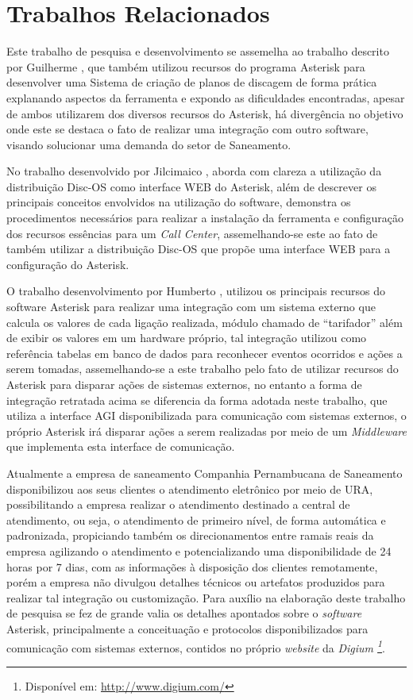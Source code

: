 \section*{Trabalhos Relacionados}
Este trabalho de pesquisa e desenvolvimento se assemelha ao trabalho descrito por Guilherme \cite{VIEIRA:2007}, que também utilizou recursos do programa Asterisk para desenvolver uma Sistema de criação de planos de discagem de forma prática explanando aspectos da ferramenta e expondo as dificuldades encontradas, apesar de ambos utilizarem dos diversos recursos do Asterisk, há divergência no objetivo onde este se destaca o fato de realizar uma integração com outro software, visando solucionar uma demanda do setor de Saneamento.

No trabalho desenvolvido por Jilcimaico \cite{DARU:2008}, aborda com clareza a utilização da distribuição Disc-OS como interface WEB do Asterisk, além de descrever os principais conceitos envolvidos na utilização do software, demonstra os procedimentos necessários para realizar a instalação da ferramenta e configuração dos recursos essências para um \textit{Call Center}, assemelhando-se este ao fato de também utilizar a distribuição Disc-OS que propõe uma interface WEB para a configuração do Asterisk.

O trabalho desenvolvimento por Humberto \cite{CAMPOS:2007}, utilizou os principais recursos do software Asterisk para realizar uma integração com um sistema externo que calcula os valores de cada ligação realizada, módulo chamado de “tarifador” além de exibir os valores em um hardware próprio, tal integração utilizou como referência tabelas em banco de dados para reconhecer eventos ocorridos e ações a serem tomadas, assemelhando-se a este trabalho pelo fato de utilizar recursos do Asterisk para disparar ações de sistemas externos, no entanto a forma de integração retratada acima se diferencia da forma adotada neste trabalho, que utiliza a interface AGI disponibilizada para comunicação com sistemas externos, o próprio Asterisk irá disparar ações a serem realizadas por meio de um \textit{Middleware} que implementa esta interface de comunicação.

Atualmente a empresa de saneamento Companhia Pernambucana de Saneamento \cite{COMPESA:URA} disponibilizou aos seus clientes o atendimento eletrônico por meio de URA, possibilitando a empresa realizar o atendimento destinado a central de atendimento, ou seja, o atendimento de primeiro nível, de forma automática e padronizada, propiciando também os direcionamentos entre ramais reais da empresa agilizando o atendimento e potencializando uma disponibilidade de 24 horas por 7 dias, com as informações à disposição dos clientes remotamente, porém a empresa não divulgou detalhes técnicos ou artefatos produzidos para realizar tal integração ou customização.
Para auxílio na elaboração deste trabalho de pesquisa se fez de grande valia os detalhes apontados sobre o \textit{software} Asterisk, principalmente a conceituação e protocolos disponibilizados para comunicação com sistemas externos, contidos no próprio \textit{website} da \textit{Digium \footnote{Disponível em: \url{http://www.digium.com/}}}. 
